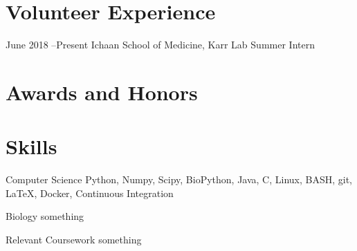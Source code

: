 \documentclass{bscv}
\begin{document}
\section{Volunteer Experience}

\begin{eventlist}
 
\item{June 2018 --Present} 
  {Ichaan School of Medicine, Karr Lab}
  {Summer Intern}

\end{eventlist}

\section{Awards and Honors}
\begin{yearlist}
\end{yearlist}

\section{Skills}

\begin{factlist}

\item{Computer Science}
     {Python, Numpy, Scipy, BioPython, Java, C, Linux, BASH, git, \LaTeX, Docker, Continuous Integration}

\item{Biology}
     {something}

\item{Relevant Coursework}
  {something}
\end{factlist}
  
\end{document}

